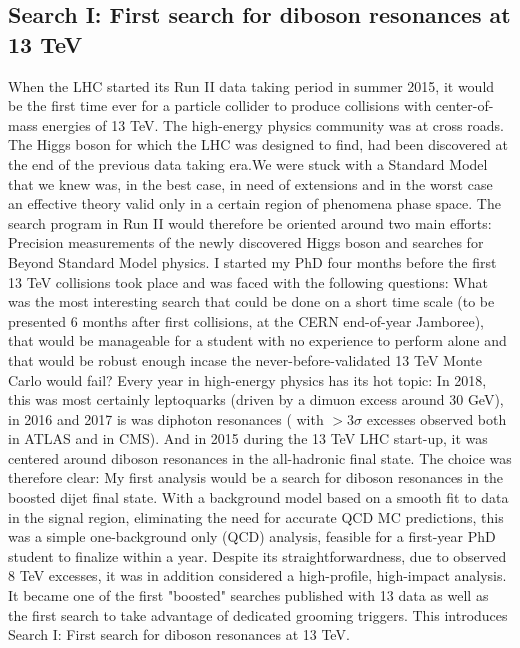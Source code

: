 \vspace*{\fill}
\begin{centering}
\section{Search I: First search for diboson resonances at 13 TeV}
When the LHC started its Run II data taking period in summer 2015, it would be the first time ever for a particle collider to produce collisions with center-of-mass energies of 13 TeV. The high-energy physics community was at cross roads. The Higgs boson for which the LHC was designed to find, had been discovered at the end of the previous data taking era.We were stuck with a Standard Model that we knew was, in the best case, in need of extensions and in the worst case an effective theory valid only in a certain region of phenomena phase space. The search program in Run II would therefore be oriented around two main efforts: Precision measurements of the newly discovered Higgs boson and searches for Beyond Standard Model physics.\newline\newline
I started my PhD four months before the first 13 TeV collisions took place and was faced with the following questions:
What was the most interesting search that could be done on a short time scale (to be presented 6 months after first collisions, at the CERN end-of-year Jamboree), that would be manageable for a student with no experience to perform alone and that would be robust enough incase the never-before-validated 13 TeV Monte Carlo would fail? \newline\newline
Every year in high-energy physics has its hot topic: In 2018, this was most certainly leptoquarks (driven by a dimuon excess around 30 GeV), in 2016 and 2017 is was diphoton resonances ( with  $>3\sigma$ excesses observed both in ATLAS and in CMS). And in 2015 during the 13 TeV LHC start-up, it was centered around diboson resonances in the all-hadronic final state.\newline\newline
The choice was therefore clear: My first analysis would be a search for diboson resonances in the boosted dijet final state. With a background model based on a smooth fit to data in the signal region, eliminating the need for accurate QCD MC predictions, this was a simple one-background only (QCD) analysis, feasible for a first-year PhD student to finalize within a year. Despite its straightforwardness, due to observed 8 TeV excesses, it was in addition considered a high-profile, high-impact analysis.
\newline\newline
It became one of the first "boosted" searches published with 13 \TeV data as well as the first search to take advantage of dedicated grooming triggers. This introduces Search I: First search for diboson resonances at 13 TeV.
\end{centering}

